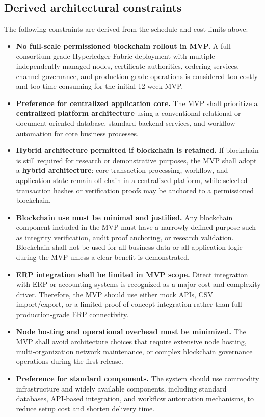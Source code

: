 \documentclass[11pt,a4paper]{article}
\begin{document}
\subsection{Derived architectural constraints}
The following constraints are derived from the schedule and cost limits above:

\begin{itemize}
\item \textbf{No full-scale permissioned blockchain rollout in MVP.} A full consortium-grade Hyperledger Fabric deployment with multiple independently managed nodes, certificate authorities, ordering services, channel governance, and production-grade operations is considered too costly and too time-consuming for the initial 12-week MVP.
\item \textbf{Preference for centralized application core.} The MVP shall prioritize a \textbf{centralized platform architecture} using a conventional relational or document-oriented database, standard backend services, and workflow automation for core business processes.
\item \textbf{Hybrid architecture permitted if blockchain is retained.} If blockchain is still required for research or demonstrative purposes, the MVP shall adopt a \textbf{hybrid architecture}: core transaction processing, workflow, and application state remain off-chain in a centralized platform, while selected transaction hashes or verification proofs may be anchored to a permissioned blockchain.
\item \textbf{Blockchain use must be minimal and justified.} Any blockchain component included in the MVP must have a narrowly defined purpose such as integrity verification, audit proof anchoring, or research validation. Blockchain shall not be used for all business data or all application logic during the MVP unless a clear benefit is demonstrated.
\item \textbf{ERP integration shall be limited in MVP scope.} Direct integration with ERP or accounting systems is recognized as a major cost and complexity driver. Therefore, the MVP should use either mock APIs, CSV import/export, or a limited proof-of-concept integration rather than full production-grade ERP connectivity.
\item \textbf{Node hosting and operational overhead must be minimized.} The MVP shall avoid architecture choices that require extensive node hosting, multi-organization network maintenance, or complex blockchain governance operations during the first release.
\item \textbf{Preference for standard components.} The system should use commodity infrastructure and widely available components, including standard databases, API-based integration, and workflow automation mechanisms, to reduce setup cost and shorten delivery time.
\end{itemize}
\end{document}
